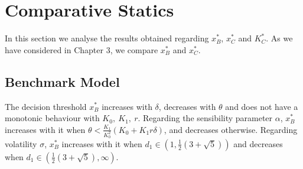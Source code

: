 











\section{Comparative Statics}

In this section we analyse the results obtained regarding $x^*_B$, $x^*_C$ and $K^*_C$. As we have considered in Chapter 3, we compare $x^*_B$ and $x^*_C$.

\subsection{Benchmark Model}
\label{2_bm}


\begin{prop}
	\label{2_prop1}
The decision threshold $x^*_B$ increases with $ \delta$, decreases with $\theta$ and does not have a monotonic behaviour with $K_0, \ K_1, \ r$. Regarding the sensibility parameter $\alpha$, $x_B^*$ increases with it when $\theta < \frac{K_1}{ K_0^2} (K_0+K_1 r \delta)$, and decreases otherwise. Regarding volatility $\sigma$,  $x_B^*$ increases with it when $d_1 \in (1,\frac{1}{2} (3+\sqrt{5}))$ and decreases when $d_1 \in \left(\frac{1}{2} (3+\sqrt{5}), \infty \right)$.
\end{prop}

